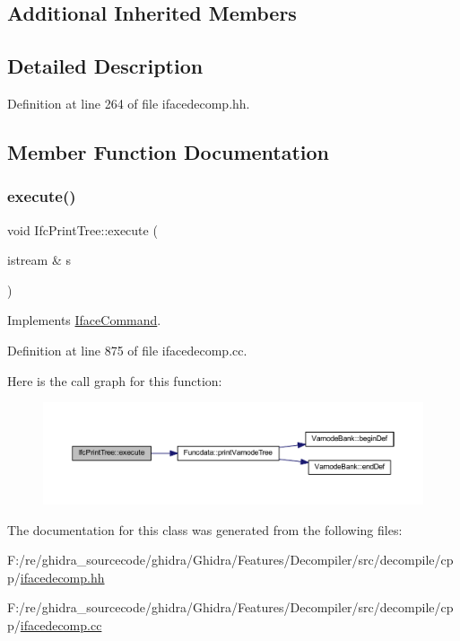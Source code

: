 \subsection*{Additional Inherited Members}


\subsection{Detailed Description}


Definition at line 264 of file ifacedecomp.\+hh.



\subsection{Member Function Documentation}
\mbox{\label{class_ifc_print_tree_ad0d5950a55f536fbba04efa4ba0ba572}} 
\subsubsection{\texorpdfstring{execute()}{execute()}}
{\footnotesize\ttfamily void Ifc\+Print\+Tree\+::execute (\begin{DoxyParamCaption}\item[{istream \&}]{s }\end{DoxyParamCaption})\hspace{0.3cm}{\ttfamily [virtual]}}



Implements \mbox{\hyperlink{class_iface_command_af10e29cee2c8e419de6efe9e680ad201}{Iface\+Command}}.



Definition at line 875 of file ifacedecomp.\+cc.

Here is the call graph for this function\+:
\nopagebreak
\begin{figure}[H]
\begin{center}
\leavevmode
\includegraphics[width=350pt]{class_ifc_print_tree_ad0d5950a55f536fbba04efa4ba0ba572_cgraph}
\end{center}
\end{figure}


The documentation for this class was generated from the following files\+:\begin{DoxyCompactItemize}
\item 
F\+:/re/ghidra\+\_\+sourcecode/ghidra/\+Ghidra/\+Features/\+Decompiler/src/decompile/cpp/\mbox{\hyperlink{ifacedecomp_8hh}{ifacedecomp.\+hh}}\item 
F\+:/re/ghidra\+\_\+sourcecode/ghidra/\+Ghidra/\+Features/\+Decompiler/src/decompile/cpp/\mbox{\hyperlink{ifacedecomp_8cc}{ifacedecomp.\+cc}}\end{DoxyCompactItemize}
